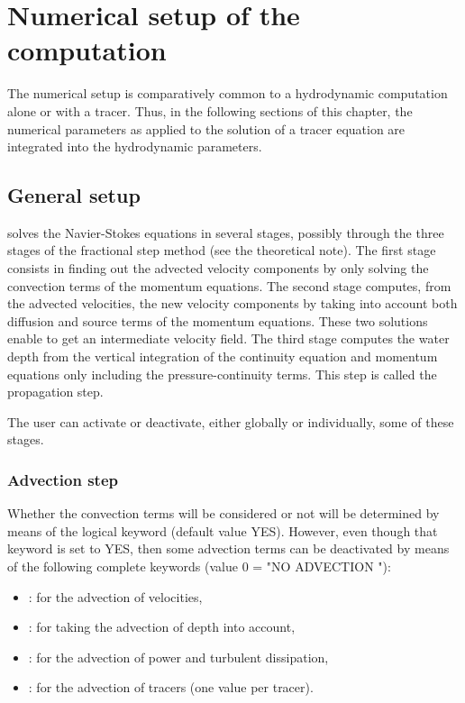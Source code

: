 \chapter{Numerical setup of the computation}

The numerical setup is comparatively common to a hydrodynamic computation alone
or with a tracer. Thus, in the following sections of this chapter, the
numerical parameters as applied to the solution of a tracer equation are
integrated into the hydrodynamic parameters.

\section{General setup}

 solves the Navier-Stokes equations in several stages, possibly
through the three stages of the fractional step method (see the theoretical
note). The first stage consists in finding out the advected velocity components
by only solving the convection terms of the momentum equations. The second
stage computes, from the advected velocities, the new velocity components by
taking into account both diffusion and source terms of the momentum equations.
These two solutions enable to get an intermediate velocity field. The third
stage computes the water depth from the vertical integration of the continuity
equation and momentum equations only including the pressure-continuity terms.
This step is called the propagation step.

The user can activate or deactivate, either globally or individually, some of
these stages.


\subsection{Advection step}
\label{sec:advstep}
Whether the convection terms will be considered or not will be determined by
means of the logical keyword  (default
value YES). However, even though that keyword is set to YES, then some
advection terms can be deactivated by means of the following complete keywords
(value 0 = "NO ADVECTION "):

\begin{itemize}
\item {}: for the advection of
velocities,

\item {}: for taking the advection of
depth into account,

\item {}: for the advection of power
and turbulent dissipation,

\item {}: for the advection of tracers
(one value per tracer).
\end{itemize}

